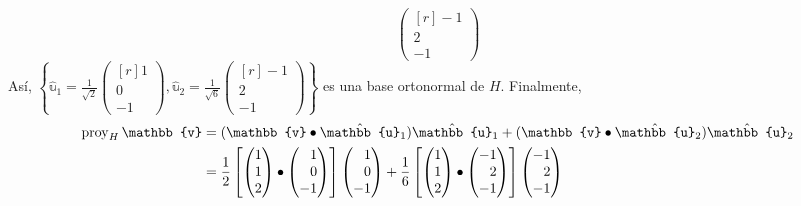 \begin{example}
$$\begin{pmatrix*}[r]
        -1 \\
        2 \\
        -1
    \end{pmatrix*}$$
    Así, $\displaystyle\left\{ \hat{\mathbb{u}}_1 = \frac{1}{\sqrt{2}} \begin{pmatrix*}[r]
        1 \\
        0 \\
        -1
    \end{pmatrix*}, \hat{\mathbb{u}}_2 = \frac{1}{\sqrt{6}} \begin{pmatrix*}[r]
        -1 \\
        2 \\
        -1
    \end{pmatrix*} \right\}$ es una base ortonormal de $H$. Finalmente,
    \begin{align*}
        \proy_H \mathbb{v} & = (\mathbb{v} \bullet \hat{\mathbb{u}}_1)\hat{\mathbb{u}}_1 + (\mathbb{v} \bullet \hat{\mathbb{u}}_2)\hat{\mathbb{u}}_2 \\
        & = \frac{1}{2} \left[ \begin{pmatrix}
            1 \\
            1 \\
            2
        \end{pmatrix} \bullet \begin{pmatrix*}[r]
            1 \\
            0 \\
            -1
        \end{pmatrix*} \right] \begin{pmatrix*}[r]
            1 \\
            0 \\
            -1
        \end{pmatrix*} + \frac{1}{6} \left[ \begin{pmatrix}
            1 \\
            1 \\
            2
        \end{pmatrix} \bullet \begin{pmatrix*}[r]
            -1 \\
            2 \\
            -1
        \end{pmatrix*} \right] \begin{pmatrix*}[r]
            -1 \\
            2 \\
            -1
        \end{pmatrix*} \\

\end{align*}
\end{example}
